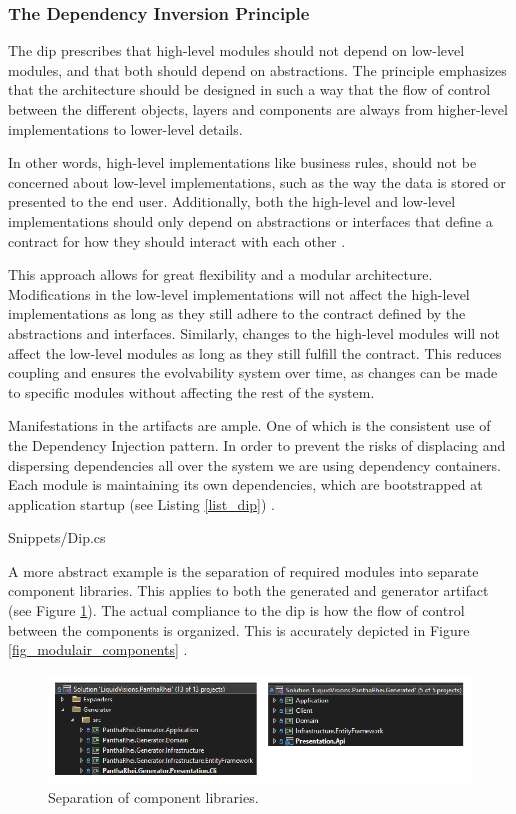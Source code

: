 \subsubsection{The Dependency Inversion Principle} \label{subsubsec_dip} 

The \gls{dip} prescribes that high-level modules should not depend on low-level modules,
and that both should depend on abstractions. The principle emphasizes that the
architecture should be designed in such a way that the flow of control between the
different objects, layers and components are always from higher-level implementations
to lower-level details.

In other words, high-level implementations like business rules, should not be concerned
about low-level implementations, such as the way the data is stored or presented to the
end user. Additionally, both the high-level and low-level implementations should only
depend on abstractions or interfaces that define a contract for how they should interact
with each other \parencite[109]{robert_c_martin_clean_2018}.

This approach allows for great flexibility and a modular architecture. Modifications in
the low-level implementations will not affect the high-level implementations as long as
they still adhere to the contract defined by the abstractions and interfaces.
Similarly, changes to the high-level modules will not affect the low-level modules as long
as they still fulfill the contract. This reduces coupling and ensures the evolvability
system over time, as changes can be made to specific modules without affecting the rest of
the system.

Manifestations in the artifacts are ample. One of which is the consistent use of the
Dependency Injection pattern. In order to prevent the risks of displacing and dispersing
dependencies all over the system \parencite[214]{mannaert_normalized_2016} we are using
dependency containers. Each module is maintaining its own dependencies, which are
bootstrapped at application startup (see Listing \ref{list_dip})
\parencite{koks_generator_2023}.


    {Snippets/Dip.cs}

A more abstract example is the separation of required modules into separate component
libraries. This applies to both the generated and generator artifact (see Figure
\ref{fig_solutions}). The actual compliance to the \gls{dip} is how the flow of control
between the components is organized. This is accurately depicted in Figure
\ref{fig_modulair_components} .

\begin{figure}[H]
    \centering
    \includegraphics[width=1\textwidth]{Figures/solutions.pdf}
    \caption[Separation of component libraries]{Separation of component libraries.}
    \label{fig_solutions}
\end{figure}